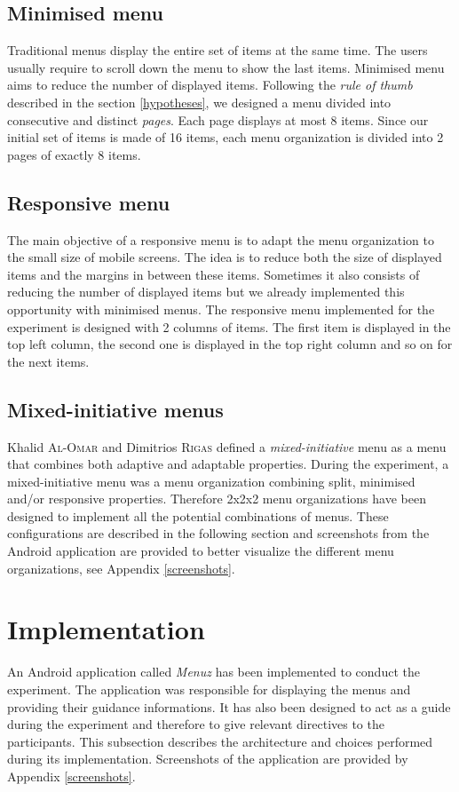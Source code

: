 \subsection{Minimised menu}
Traditional menus display the entire set of items at the same time. The users 
usually require to scroll down the menu to show the last items. Minimised menu 
aims to reduce the number of displayed items. Following the \textit{rule of 
thumb} described in the section \ref{hypotheses}, we designed a menu divided 
into consecutive and distinct \textit{pages}. Each page displays at most 8 
items. Since our initial set of items is made of 16 items, each menu 
organization is divided into 2 pages of exactly 8 items.

\subsection{Responsive menu}
The main objective of a responsive menu is to adapt the menu organization to 
the small size of mobile screens. The idea is to reduce both the size of 
displayed items and the margins in between these items. Sometimes it also 
consists of 
reducing the number of displayed items but we already implemented this 
opportunity with minimised menus. The responsive menu implemented for the 
experiment is designed with 2 columns of items. The first item is displayed in 
the top left column, the second one is displayed in the top right column and so 
on for the next items.

\subsection{Mixed-initiative menus}
Khalid \textsc{Al-Omar} and Dimitrios \textsc{Rigas} defined a 
\textit{mixed-initiative} menu as 
a menu that combines both adaptive and adaptable properties. During the 
experiment, a mixed-initiative menu was a menu organization combining split, 
minimised and/or responsive properties. Therefore 2x2x2 menu organizations have 
been designed to implement all the potential combinations of 
menus. These configurations are described in the following section and 
screenshots from the Android application are provided to better visualize the 
different menu organizations, see Appendix \ref{screenshots}.

\section{Implementation}
An Android application called \textit{Menuz} has been implemented to conduct 
the experiment. The application was responsible for displaying the menus and 
providing their guidance informations. It has also been designed to act as a 
guide during the experiment and therefore to give relevant directives to the 
participants. This subsection describes the architecture and choices performed 
during its implementation. Screenshots of the application are provided by 
Appendix \ref{screenshots}.

